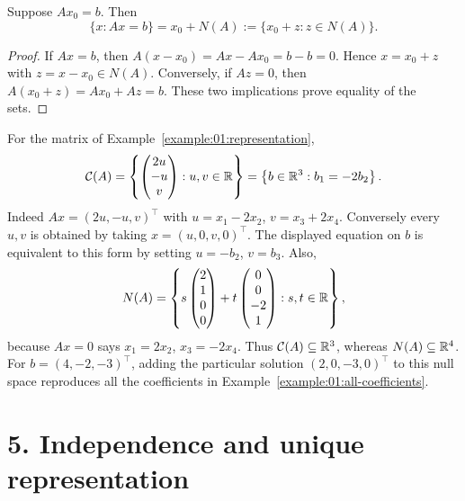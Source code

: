 \begin{theorem}\label{thm:01:translate}
Suppose \(Ax_0=b\). Then
\[
\{x:Ax=b\}=x_0+N(A):=\{x_0+z:z\in N(A)\}.
\]
\end{theorem}
\begin{proof}
If \(Ax=b\), then \(A(x-x_0)=Ax-Ax_0=b-b=0\). Hence
\(x=x_0+z\) with \(z=x-x_0\in N(A)\).
Conversely, if \(Az=0\), then \(A(x_0+z)=Ax_0+Az=b\).
These two implications prove equality of the sets.
\end{proof}

\begin{example}\label{example:01:spaces}
For the matrix of Example~\ref{example:01:representation},
\[
\mathcal C(A)=
\left\{\begin{pmatrix}2u\\-u\\v\end{pmatrix}:u,v\in\mathbb R\right\}
=\left\{b\in\mathbb R^3:b_1=-2b_2\right\}.
\]
Indeed \(Ax=(2u,-u,v)^\top\) with \(u=x_1-2x_2\),
\(v=x_3+2x_4\). Conversely every \(u,v\) is obtained by taking
\(x=(u,0,v,0)^\top\). The displayed equation on \(b\) is equivalent
to this form by setting \(u=-b_2\), \(v=b_3\).
Also,
\[
N(A)=\left\{
 s\begin{pmatrix}2\\1\\0\\0\end{pmatrix}
+t\begin{pmatrix}0\\0\\-2\\1\end{pmatrix}:s,t\in\mathbb R
\right\},
\]
because \(Ax=0\) says \(x_1=2x_2\), \(x_3=-2x_4\).
Thus \(\mathcal C(A)\subseteq\mathbb R^3\), whereas \(N(A)\subseteq\mathbb R^4\).
For \(b=(4,-2,-3)^\top\), adding the particular solution
\((2,0,-3,0)^\top\) to this null space reproduces all the coefficients
in Example~\ref{example:01:all-coefficients}.
\end{example}

\section*{5. Independence and unique representation}

